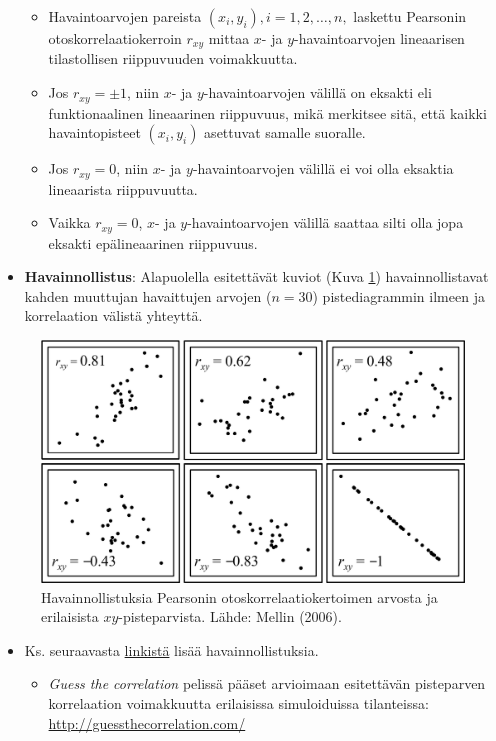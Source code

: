 \documentclass[
]{book}
\providecommand{\tightlist}{%
  \setlength{\itemsep}{0pt}\setlength{\parskip}{0pt}}
\begin{document}
\begin{itemize}
  \begin{itemize}
  \tightlist
  \item
    Havaintoarvojen pareista \((x_i, y_i), i = 1,2, \ldots, n,\) laskettu Pearsonin otoskorrelaatiokerroin \(r_{xy}\) mittaa \(x\)- ja \(y\)-havaintoarvojen lineaarisen tilastollisen riippuvuuden voimakkuutta.
  \item
    Jos \(r_{xy} = \pm 1\), niin \(x\)- ja \(y\)-havaintoarvojen välillä on eksakti eli funktionaalinen lineaarinen riippuvuus, mikä merkitsee sitä, että kaikki havaintopisteet \((x_i, y_i)\) asettuvat samalle suoralle.
  \item
    Jos \(r_{xy} = 0\), niin \(x\)- ja \(y\)-havaintoarvojen välillä ei voi olla eksaktia lineaarista riippuvuutta.
  \item
    Vaikka \(r_{xy} = 0\), \(x\)- ja \(y\)-havaintoarvojen välillä saattaa silti olla jopa eksakti epälineaarinen riippuvuus.
  \end{itemize}
\item
  \textbf{Havainnollistus}: Alapuolella esitettävät kuviot (Kuva \ref{fig:korrelaatioMellin}) havainnollistavat kahden muuttujan havaittujen arvojen (\(n = 30\)) pistediagrammin ilmeen ja korrelaation välistä yhteyttä.
\end{itemize}

\FloatBarrier

\begin{figure}

{\centering \includegraphics[width=0.9\linewidth]{images/Pearson-korr-Mellin} 

}

\caption{Havainnollistuksia Pearsonin otoskorrelaatiokertoimen arvosta ja erilaisista $xy$-pisteparvista. Lähde: Mellin (2006).}\label{fig:korrelaatioMellin}
\end{figure}

\begin{itemize}
\tightlist
\item
  Ks. seuraavasta \href{http://guessthecorrelation.com/}{linkistä} lisää havainnollistuksia.

  \begin{itemize}
  \tightlist
  \item
    \emph{Guess the correlation} pelissä pääset arvioimaan esitettävän pisteparven korrelaation voimakkuutta erilaisissa simuloiduissa tilanteissa: \url{http://guessthecorrelation.com/}
  \end{itemize}
\end{itemize}
\end{document}
